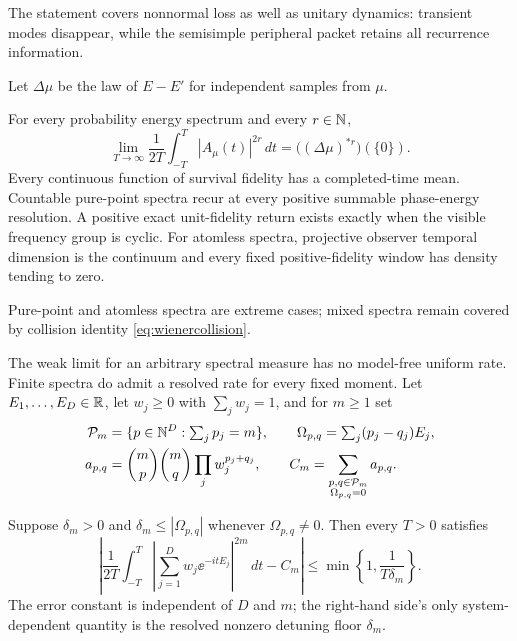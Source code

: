 The statement covers nonnormal loss as well as unitary dynamics: transient
modes disappear, while the semisimple peripheral packet retains all
recurrence information.

Let $\Delta\mu$ be the law of $E-E'$ for independent samples from $\mu$.

\begin{theorem}
\label{thm:stationary}
For every probability energy spectrum and every $r\in\mathbb N$,
\begin{equation}
 \lim_{T\to\infty}\frac1{2T}\int_{-T}^{T}|A_\mu(t)|^{2r}\,dt
 =\bigl((\Delta\mu)^{*r}\bigr)(\{0\}).               \label{eq:wienercollision}
\end{equation}
Every continuous function of survival fidelity has a completed-time mean.
Countable pure-point spectra recur at every positive summable phase-energy
resolution.  A positive exact unit-fidelity return exists exactly when the
visible frequency group is cyclic.  For atomless spectra, projective observer
temporal dimension is the continuum and every fixed positive-fidelity window
has density tending to zero.
\end{theorem}

Pure-point and atomless spectra are extreme cases; mixed spectra remain
covered by collision identity \eqref{eq:wienercollision}.

The weak limit for an arbitrary spectral measure has no model-free uniform
rate.  Finite spectra do admit a resolved rate for every fixed moment.
Let $E_1,\ldots,E_D\in\mathbb R$, let $w_j\ge0$ with $\sum_jw_j=1$, and for
$m\ge1$ set
\begin{align}
 \mathcal P_m&=\{p\in\mathbb N^D:\textstyle\sum_jp_j=m\},\qquad
 \Omega_{p,q}=\sum_j(p_j-q_j)E_j,\notag\\
 a_{p,q}&=\binom{m}{p}\binom{m}{q}
               \prod_jw_j^{p_j+q_j},\qquad
 C_m=\sum_{\substack{p,q\in\mathcal P_m\\\Omega_{p,q}=0}}a_{p,q}.
                                                        \label{eq:finite-moment-data}
\end{align}

\begin{theorem}
\label{thm:finite-window-moments}
Suppose $\delta_m>0$ and
$\delta_m\le |\Omega_{p,q}|$ whenever $\Omega_{p,q}\ne0$.  Then every
$T>0$ satisfies
\begin{equation}
 \boxed{\left|
 \frac1{2T}\int_{-T}^{T}
 \left|\sum_{j=1}^{D}w_j\ee^{-itE_j}\right|^{2m}\,dt-C_m
 \right|\le \min\left\{1,\frac1{T\delta_m}\right\}.}       \label{eq:finite-moment-rate}
\end{equation}
The error constant is independent of $D$ and $m$; the right-hand side's only
system-dependent quantity is the resolved nonzero detuning floor $\delta_m$.
\end{theorem}

